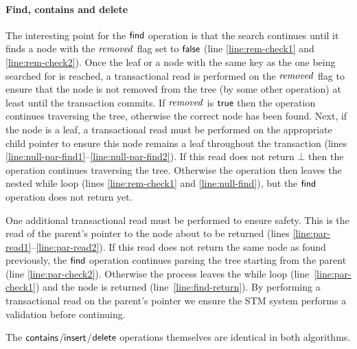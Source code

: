 \paragraph{Find, contains and delete}
The interesting point for the $\act{find}$ operation is that the search continues until it finds a node with the $\ms{removed}$ flag set to $\lit{false}$
(line \ref{line:rem-check1} and \ref{line:rem-check2}).
Once the leaf or a node with the same key as the one being searched for is reached, a transactional read is performed on the $\ms{removed}$ flag to
ensure that the node is not removed from the tree (by some other operation) at least until the transaction commits.
If $\ms{removed}$ is $\lit{true}$ then the operation continues traversing the tree, otherwise 
the correct node has been found.
Next, if the node is a leaf, a transactional read must be performed on the appropriate child pointer to ensure this node remains a leaf throughout
the transaction (lines \ref{line:null-par-find1}--\ref{line:null-par-find2}).
If this read does not return $\bot$ then the operation continues traversing the tree.
Otherwise the operation then leaves the nested while loop 
(lines \ref{line:rem-check1} and \ref{line:null-find}), but the $\act{find}$ operation does not return yet.

One additional transactional read must be performed to ensure safety.
This is the read of the parent's pointer to the node about to be returned (lines \ref{line:par-read1}--\ref{line:par-read2}).
If this read does not return the same node as found previously, the $\act{find}$ operation continues parsing the tree 
starting from the parent (line \ref{line:par-check2}).
Otherwise the process leaves the while loop (line~\ref{line:par-check1}) and the node is returned (line~\ref{line:find-return}).
By performing a transactional read on the parent's pointer we ensure the STM system performs a validation before continuing.

The $\act{contains}$/$\act{insert}$/$\act{delete}$ operations themselves are identical in both algorithms.

